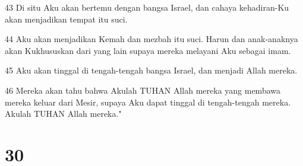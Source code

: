 \par 43 Di situ Aku akan bertemu dengan bangsa Israel, dan cahaya kehadiran-Ku akan menjadikan tempat itu suci.
\par 44 Aku akan menjadikan Kemah dan mezbah itu suci. Harun dan anak-anaknya akan Kukhususkan dari yang lain supaya mereka melayani Aku sebagai imam.
\par 45 Aku akan tinggal di tengah-tengah bangsa Israel, dan menjadi Allah mereka.
\par 46 Mereka akan tahu bahwa Akulah TUHAN Allah mereka yang membawa mereka keluar dari Mesir, supaya Aku dapat tinggal di tengah-tengah mereka. Akulah TUHAN Allah mereka."

\chapter{30}

